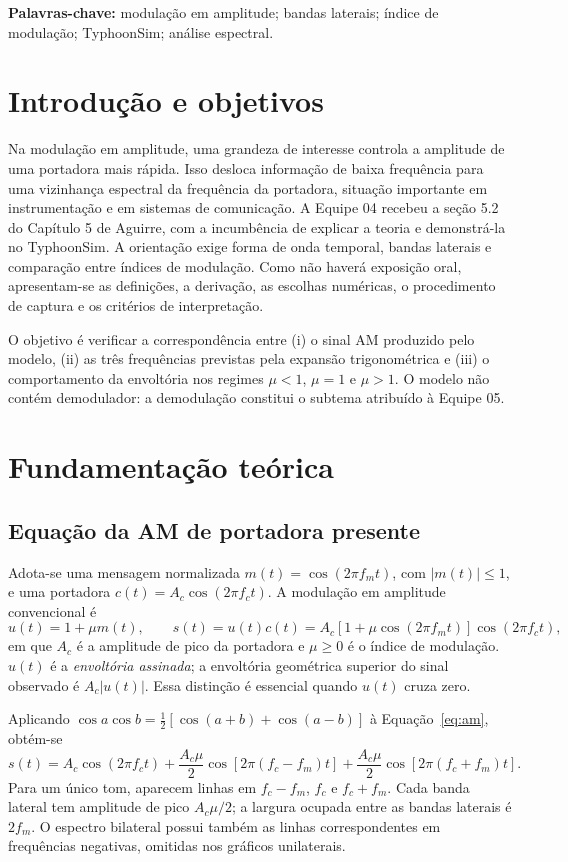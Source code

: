 \documentclass[11pt,a4paper]{article}
\begin{document}
\noindent\textbf{Palavras-chave:} modulação em amplitude; bandas laterais; índice de modulação; TyphoonSim; análise espectral.

\clearpage
\tableofcontents
\clearpage
{}

\section{Introdução e objetivos}
Na modulação em amplitude, uma grandeza de interesse controla a amplitude de uma portadora mais rápida. Isso desloca informação de baixa frequência para uma vizinhança espectral da frequência da portadora, situação importante em instrumentação e em sistemas de comunicação. A Equipe 04 recebeu a seção 5.2 do Capítulo 5 de Aguirre, com a incumbência de explicar a teoria e demonstrá-la no TyphoonSim. A orientação exige forma de onda temporal, bandas laterais e comparação entre índices de modulação. Como não haverá exposição oral, apresentam-se as definições, a derivação, as escolhas numéricas, o procedimento de captura e os critérios de interpretação.

O objetivo é verificar a correspondência entre (i) o sinal AM produzido pelo modelo, (ii) as três frequências previstas pela expansão trigonométrica e (iii) o comportamento da envoltória nos regimes $\mu<1$, $\mu=1$ e $\mu>1$. O modelo não contém demodulador: a demodulação constitui o subtema atribuído à Equipe 05.

\section{Fundamentação teórica}
\subsection{Equação da AM de portadora presente}
Adota-se uma mensagem normalizada $m(t)=\cos(2\pi f_m t)$, com $|m(t)|\leq 1$, e uma portadora $c(t)=A_c\cos(2\pi f_c t)$. A modulação em amplitude convencional é
\begin{equation}
 u(t)=1+\mu m(t),\qquad s(t)=u(t)c(t)
 =A_c[1+\mu\cos(2\pi f_m t)]\cos(2\pi f_c t),
 \label{eq:am}
\end{equation}
em que $A_c$ é a amplitude de pico da portadora e $\mu\geq0$ é o índice de modulação. $u(t)$ é a \emph{envoltória assinada}; a envoltória geométrica superior do sinal observado é $A_c|u(t)|$. Essa distinção é essencial quando $u(t)$ cruza zero.

Aplicando $\cos a\cos b=\tfrac12[\cos(a+b)+\cos(a-b)]$ à Equação~\eqref{eq:am}, obtém-se
\begin{equation}
 s(t)=A_c\cos(2\pi f_c t)
 +\frac{A_c\mu}{2}\cos[2\pi(f_c-f_m)t]
 +\frac{A_c\mu}{2}\cos[2\pi(f_c+f_m)t].
 \label{eq:spectrum}
\end{equation}
Para um único tom, aparecem linhas em $f_c-f_m$, $f_c$ e $f_c+f_m$. Cada banda lateral tem amplitude de pico $A_c\mu/2$; a largura ocupada entre as bandas laterais é $2f_m$. O espectro bilateral possui também as linhas correspondentes em frequências negativas, omitidas nos gráficos unilaterais.
\end{document}
